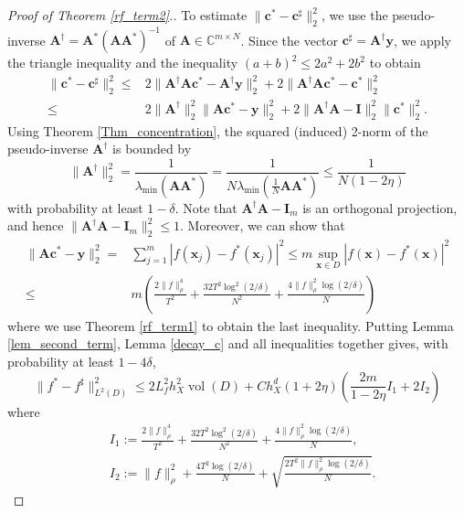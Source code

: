 \documentclass[11pt,twoside]{article}
\theoremstyle{plain}
\theoremstyle{definition}
\theoremstyle{remark}
\newcommand{\C}{\mathbb{C}}
\newcommand{\Ab}{\mathbf{A}}
\newcommand{\Ib}{\mathbf{I}}
\newcommand{\xb}{\mathbf{x}}
\newcommand{\yb}{\mathbf{y}}
\newcommand{\cb}{\mathbf{c}}
\newcommand{\vol}{\mathop{\mathrm{vol}}}
\begin{document}
\begin{proof}[Proof of Theorem \ref{rf_term2}.]
To estimate $\|\cb^*-\cb^\sharp\|^2_2$, we use the pseudo-inverse $\Ab^\dagger = \Ab^*(\Ab\Ab^*)^{-1}$ of $\Ab\in\C^{m\times N}$. Since the vector $\cb^\sharp = \Ab^\dagger \yb$, we apply the triangle inequality and the inequality $(a+b)^2 \leq 2a^2 + 2b^2$ to obtain
\begin{equation*}
\begin{aligned}
\| \cb^* - \cb^\sharp\|_2^2 \leq & 2\| \Ab^\dagger \Ab\cb^* - \Ab^\dagger \yb\|_2^2 + 2\|\Ab^\dagger \Ab \cb^* - \cb^*\|_2^2 \\
\leq & 2\| \Ab^\dagger \|_2^2 \|\Ab\cb^* - \yb\|_2^2 + 2\|\Ab^\dagger \Ab - \Ib\|_2^2\|\cb^*\|_2^2.
\end{aligned}
\end{equation*}
Using Theorem \ref{Thm_concentration}, the squared (induced) 2-norm of the pseudo-inverse $\Ab^\dagger$ is bounded by
\begin{equation*}
\|\Ab^\dagger\|_2^2 = \frac{1}{\lambda_{\min}(\Ab\Ab^*)} =  \frac{1}{N\lambda_{\min}\left(\frac{1}{N}\Ab\Ab^*\right)} \leq \frac{1}{N(1-2\eta)}
\end{equation*}
with probability at least $1-\delta$.
Note that $\Ab^\dagger \Ab - \Ib_m$ is an orthogonal projection, and hence $\|\Ab^\dagger \Ab - \Ib_m\|_2^2 \leq 1$. Moreover, we can show that 
\begin{equation*}
\begin{aligned}
\|\Ab\cb^* - \yb\|_2^2 =& \sum_{j=1}^m |f(\xb_j) - f^*(\xb_j)|^2 \leq m \sup_{\xb\in D} |f(\xb) - f^*(\xb)|^2 \\
\leq & m \left( \frac{2\|f\|_\rho^4}{T^2} + \frac{32T^2\log^2(2/\delta)}{N^2} + \frac{4\|f\|^2_\rho\log(2/\delta)}{N} \right)
\end{aligned}
\end{equation*}
where we use Theorem \ref{rf_term1} to obtain the last inequality. Putting Lemma \ref{lem_second_term}, Lemma \ref{decay_c} and all inequalities together gives, with probability at least $1-4\delta$,
\begin{equation}
 \|f^* - f^\sharp\|_{L^2(D)}^2 
\leq 2L_f^2h_X^2\vol(D) + Ch_X^d(1+2\eta)\left( \frac{2m}{1-2\eta}I_1 + 2I_2 \right)
\end{equation}
where 
\begin{equation*}
\begin{aligned}
&I_1 := \frac{2\|f\|_\rho^4}{T^2} + \frac{32T^2\log^2(2/\delta)}{N^2} + \frac{4\|f\|^2_\rho\log(2/\delta)}{N}, \\
&I_2 := \|f\|_\rho^2 + \frac{4T^2\log(2/\delta)}{N} + \sqrt{\frac{2T^2\|f\|_\rho^2\log(2/\delta)}{N}}.
\end{aligned}
\end{equation*}
\end{proof}
\end{document}
